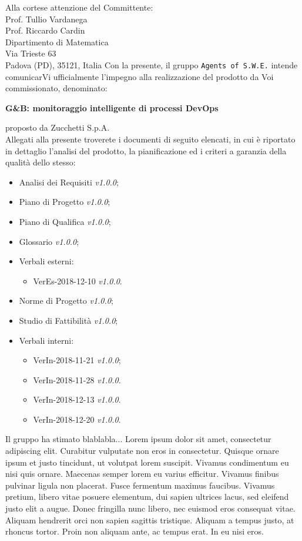\documentclass[11pt, a4paper]{letter} %
\begin{document}
\begin{letter}{
	\-\\\-\\\-\\\-\\\-\\
	Alla cortese attenzione del Committente:	\\
	Prof. Tullio Vardanega\\
	Prof. Riccardo Cardin\\	
	Dipartimento di Matematica\\ 
	Via Trieste 63\\ 
	Padova (PD), 35121, Italia
}
Con la presente, il gruppo \texttt{Agents of S.W.E.} intende comunicarVi ufficialmente l'impegno alla realizzazione del prodotto da Voi commissionato, denominato:
\begin{center}
	\textbf{G\&B: monitoraggio intelligente di processi DevOps}
\end{center}
proposto da Zucchetti S.p.A.\\
Allegati alla presente troverete i documenti di seguito elencati, in cui è riportato in dettaglio l'analisi del prodotto, la pianificazione ed i criteri a garanzia della qualità dello stesso:
\begin{itemize}
	\item Analisi dei Requisiti \textit{v1.0.0};
	\item Piano di Progetto \textit{v1.0.0};
	\item Piano di Qualifica \textit{v1.0.0};
	\item Glossario \textit{v1.0.0};
	\item Verbali esterni: 
		\begin{itemize}
			\item VerEs-2018-12-10 \textit{v1.0.0}.
		\end{itemize}
	\item Norme di Progetto \textit{v1.0.0};	
	\item Studio di Fattibilità \textit{v1.0.0};
	\item Verbali interni: 
		\begin{itemize}
			\item VerIn-2018-11-21 \textit{v1.0.0};
			\item VerIn-2018-11-28 \textit{v1.0.0}.
			\item VerIn-2018-12-13 \textit{v1.0.0}.
			\item VerIn-2018-12-20 \textit{v1.0.0}.
		\end{itemize}
\end{itemize}
Il gruppo ha stimato blablabla... Lorem ipsum dolor sit amet, consectetur adipiscing elit. Curabitur vulputate non eros in consectetur. Quisque ornare ipsum et justo tincidunt, ut volutpat lorem suscipit. Vivamus condimentum eu nisi quis ornare. Maecenas semper lorem eu varius efficitur. Vivamus finibus pulvinar ligula non placerat. Fusce fermentum maximus faucibus. Vivamus pretium, libero vitae posuere elementum, dui sapien ultrices lacus, sed eleifend justo elit a augue. Donec fringilla nunc libero, nec euismod eros consequat vitae. Aliquam hendrerit orci non sapien sagittis tristique. Aliquam a tempus justo, at rhoncus tortor. Proin non aliquam ante, ac tempus erat. In eu nisi eros.\\


\end{letter}
\end{document}
